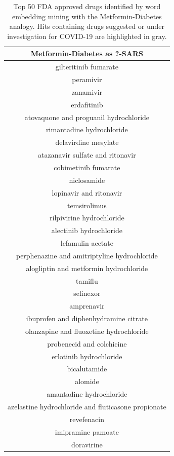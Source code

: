 \documentclass{article}
\newcommand{\lgc}[1]{\cellcolor[gray]{0.85}#1}
\begin{document}
\begin{table}[t!]
\footnotesize
\centering
\caption{Top 50 FDA approved drugs identified by word embedding mining with the Metformin-Diabetes analogy. Hits containing drugs suggested or under investigation for COVID-19 are highlighted in gray.}
\label{tab:drugs_metf_top50}
\begin{tabular}[t]{c}
\hline
Metformin-Diabetes as ?-SARS \\
\hline
gilteritinib fumarate \\
peramivir \\
\lgc{zanamivir\cite{hall2020search}} \\
erdafitinib \\
atovaquone and proguanil hydrochloride \\
rimantadine hydrochloride \\
delavirdine mesylate \\
\lgc{atazanavir sulfate and ritonavir\cite{cao2020trial}} \\
cobimetinib fumarate \\
\lgc{niclosamide\cite{xu2020broad}} \\
\lgc{lopinavir and ritonavir\cite{cao2020trial}} \\
temsirolimus \\
rilpivirine hydrochloride \\
alectinib hydrochloride \\
lefamulin acetate \\
perphenazine and amitriptyline hydrochloride \\
alogliptin and metformin hydrochloride \\
tamiflu \\
selinexor \\
amprenavir \\
ibuprofen and diphenhydramine citrate \\
olanzapine and fluoxetine hydrochloride \\
\lgc{probenecid and colchicine\cite{colcorona}} \\
erlotinib hydrochloride \\
bicalutamide \\
alomide \\
amantadine hydrochloride \\
\lgc{azelastine hydrochloride and fluticasone propionate\cite{mccreary2020coronavirus}} \\
revefenacin \\
imipramine pamoate \\
doravirine \\

\end{tabular}
\end{table}
\end{document}
